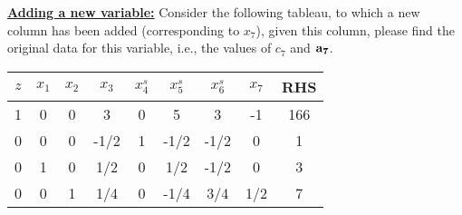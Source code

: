 \bigskip \underline{\bf Adding a new variable:}
Consider the following tableau, to which a new column has been added (corresponding to $x_7$), given this column, please find the original data for this variable, i.e., the values of $c_7$ and ${\bf a_7}$.
\begin{center} \begin{tabular} {|c|c|c|c|c|c|c|c|c|}
\hline $z$ & $x_1$ & $x_2$ & $x_3$ & $x^s_4$ & $x^s_5$ & $x^s_6$  & $x_7$ & RHS   \\ \hline
\hline  1  & 0     & 0     & 3      & 0    & 5     & 3      & -1 & 166   \\
\hline  0  & 0     & 0     & -1/2   & 1    & -1/2  & -1/2  & 0   & 1     \\
\hline  0  & 1     & 0     & 1/2    & 0    & 1/2   & -1/2  & 0   & 3    \\
\hline  0  & 0     & 1     & 1/4    & 0    & -1/4  & 3/4   & 1/2 & 7     \\ \hline
\end{tabular} \end{center}

